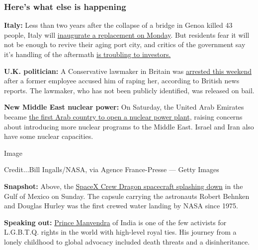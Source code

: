 \hypertarget{heres-what-else-is-happening}{%
\subsubsection{Here's what else is
happening}\label{heres-what-else-is-happening}}

\textbf{Italy:} Less than two years after the collapse of a bridge in
Genoa killed 43 people, Italy will
\href{https://www.nytimes3xbfgragh.onion/2020/08/02/world/europe/genoa-Morandi-bridge-replacement.html}{inaugurate
a replacement on Monday}. But residents fear it will not be enough to
revive their aging port city, and critics of the government say it's
handling of the aftermath
\href{https://www.nytimes3xbfgragh.onion/2020/08/01/world/europe/italy-genoa-bridge-collapse-benettons.html}{is
troubling to investors.}

\textbf{U.K. politician:} A Conservative lawmaker in Britain was
\href{https://www.nytimes3xbfgragh.onion/2020/08/02/world/europe/uk-conservative-lawmaker-arrest.html}{arrested
this weekend} after a former employee accused him of raping her,
according to British news reports. The lawmaker, who has not been
publicly identified, was released on bail.

\textbf{New Middle East nuclear power:} On Saturday, the United Arab
Emirates became
\href{https://www.nytimes3xbfgragh.onion/2020/08/01/world/middleeast/uae-nuclear-Barakah.html}{the
first Arab country to open a nuclear power plant}, raising concerns
about introducing more nuclear programs to the Middle East. Israel and
Iran also have some nuclear capacities.

Image

Credit...Bill Ingalls/NASA, via Agence France-Presse --- Getty Images

\textbf{Snapshot:} Above, the
\href{https://www.nytimes3xbfgragh.onion/2020/08/02/science/spacex-nasa-return.html?action=click\&module=Top\%20Stories\&pgtype=Homepage}{SpaceX
Crew Dragon spacecraft splashing down} in the Gulf of Mexico on Sunday.
The capsule carrying the astronauts Robert Behnken and Douglas Hurley
was the first crewed water landing by NASA since 1975.

\textbf{Speaking out:}
\href{https://www.nytimes3xbfgragh.onion/2020/07/31/world/asia/india-prince-manvendra-gay-rights.html}{Prince
Manvendra} of India is one of the few activists for L.G.B.T.Q. rights in
the world with high-level royal ties. His journey from a lonely
childhood to global advocacy included death threats and a
disinheritance.

